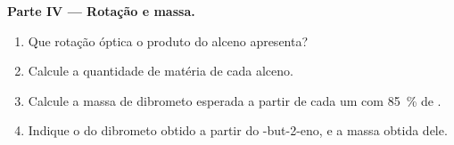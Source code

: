 \begin{problem}
\medskip
\noindent\textbf{Parte IV --- Rotação e massa.}
\begin{enumerate}[resume]
  \item Que rotação óptica o produto do alceno  apresenta?
  \item Calcule a quantidade de matéria de cada alceno.
  \item Calcule a massa de dibrometo esperada a partir de cada um com
        \qty{85}{\percent} de .
  \item Indique o  do dibrometo obtido a partir
        do -but-2-eno, e a massa obtida dele.
\end{enumerate}
\end{problem}
